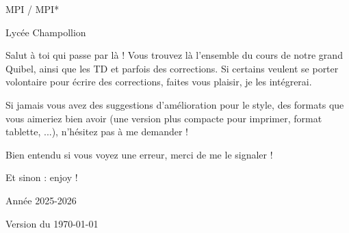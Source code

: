 \documentclass{../commun/prepacours}
\begin{document}
\begin{center}
  \vspace*{2cm}
  
  
  \vspace{1.5cm}
  {\Large MPI / MPI* \par}
  \vspace{0.5cm}
  {\large Lycée Champollion \par}
  \vspace{2cm}
  
  \begin{minipage}{0.8\textwidth}
    \vspace{0.5cm}
    
    Salut à toi qui passe par là ! Vous trouvez là l'ensemble du cours de notre grand Quibel, ainsi que les 
    TD et parfois des corrections. Si certains veulent se porter volontaire pour écrire des corrections, faites 
    vous plaisir, je les intégrerai. 

    \avspace Si jamais vous avez des suggestions d'amélioration pour le style, 
    des formats que vous aimeriez bien avoir (une version plus compacte pour 
    imprimer, format tablette, ...), n'hésitez pas à me demander !

    \avspace Bien entendu si vous voyez une erreur, merci de me le signaler !

    \begin{center}
      Et sinon : enjoy !
    \end{center}
    
    \vspace{0.5cm}
  \end{minipage}
  
  \vfill
  {\Large Année 2025-2026 \par}
  \vspace{0.5cm}
  {\normalsize Version du \today \par}
  \vspace{1cm}
\end{center}
\clearpage
\end{document}
